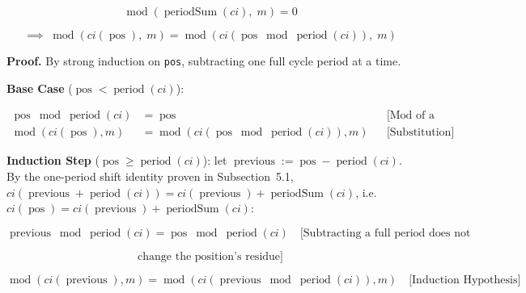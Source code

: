 \begin{equation*}
\operatorname{mod}(\operatorname{periodSum}(ci),\; m) = 0
\end{equation*}

\begin{equation*}
\implies\;
\operatorname{mod}(ci(\operatorname{pos}),\; m) = \operatorname{mod}(ci(\operatorname{pos} \bmod \operatorname{period}(ci)),\; m)
\end{equation*}

\textbf{Proof.} By strong induction on \texttt{pos}, subtracting one full
cycle period at a time.

\textbf{Base Case} ($\operatorname{pos} < \operatorname{period}(ci)$):

\begin{equation*}
\begin{aligned}
\operatorname{pos} \bmod \operatorname{period}(ci) &= \operatorname{pos}
  &&\text{[Mod of a value smaller than the divisor]} \\
\operatorname{mod}(ci(\operatorname{pos}), m) &= \operatorname{mod}(ci(\operatorname{pos} \bmod \operatorname{period}(ci)), m)
  &&\text{[Substitution]}
\end{aligned}
\end{equation*}

\textbf{Induction Step} ($\operatorname{pos} \geq \operatorname{period}(ci)$):
let $\operatorname{previous} := \operatorname{pos} - \operatorname{period}(ci)$. By
the one-period shift identity proven in Subsection~5.1,
$ci(\operatorname{previous} + \operatorname{period}(ci)) = ci(\operatorname{previous}) + \operatorname{periodSum}(ci)$, i.e.
$ci(\operatorname{pos}) = ci(\operatorname{previous}) + \operatorname{periodSum}(ci)$:

\begin{equation*}
\operatorname{previous} \bmod \operatorname{period}(ci) = \operatorname{pos} \bmod \operatorname{period}(ci)
  \quad \text{[Subtracting a full period does not}
\end{equation*}

\begin{equation*}
\text{change the position's residue]}
\end{equation*}

\begin{equation*}
\operatorname{mod}(ci(\operatorname{previous}), m) = \operatorname{mod}(ci(\operatorname{previous} \bmod \operatorname{period}(ci)), m)
  \quad \text{[Induction Hypothesis]}
\end{equation*}

